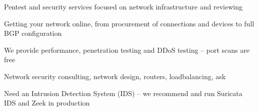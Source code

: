 \documentclass[12pt]{foils}
\begin{document}
{}

\LogoOn



\begin{list2}
\item  Pentest and security services focused on network infrastructure and reviewing
\item Getting your network online, from procurement of connections and devices to full BGP configuration
\item We provide performance, penetration testing and DDoS testing -- port scans are free
\item Network security consulting, network design, routers, loadbalancing, ask
\item Need an Intrusion Detection System (IDS) -- we recommend and run Suricata IDS and Zeek in production
\end{list2}
\end{document}
